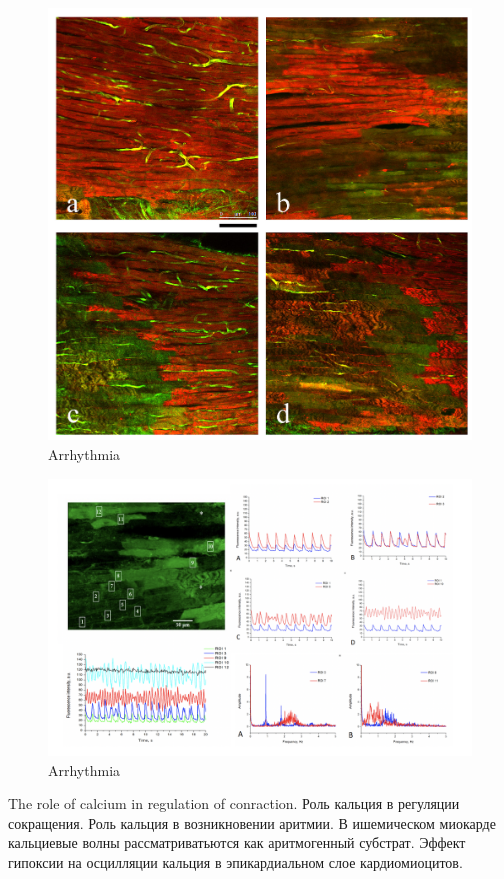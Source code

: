 \documentclass[a4paper,12pt]{article}
\begin{document}
\begin{figure}
    \includegraphics[width=\linewidth]{fig1.jpg}
    \caption{Arrhythmia}
    \label{fig:fig1}
\end{figure}

\begin{figure}
    \includegraphics[width=\linewidth]{fig2.png}
    \caption{Arrhythmia}
    \label{fig:fig2}
\end{figure}

The role of calcium in regulation of conraction.
Роль кальция в регуляции сокращения.
Роль кальция в  возникновении аритмии.
В ишемическом миокарде кальциевые волны рассматриватьются как аритмогенный субстрат.
Эффект гипоксии на осцилляции кальция в эпикардиальном слое кардиомиоцитов.
\end{document}
